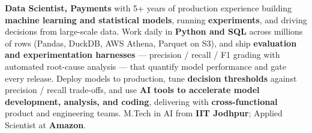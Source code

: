 \documentclass[letter,10pt]{article}
\begin{document}

\textbf{Data Scientist, Payments} with 5+ years of production experience building \textbf{machine learning and statistical models}, running \textbf{experiments}, and driving decisions from large-scale data.
Work daily in \textbf{Python and SQL} across millions of rows (Pandas, DuckDB, AWS Athena, Parquet on S3), and ship \textbf{evaluation and experimentation harnesses} --- precision / recall / F1 grading with automated root-cause analysis --- that quantify model performance and gate every release.
Deploy models to production, tune \textbf{decision thresholds} against precision / recall trade-offs, and use \textbf{AI tools to accelerate model development, analysis, and coding}, delivering with \textbf{cross-functional} product and engineering teams.
M.Tech in AI from \textbf{IIT Jodhpur}; Applied Scientist at \textbf{Amazon}.
\end{document}
